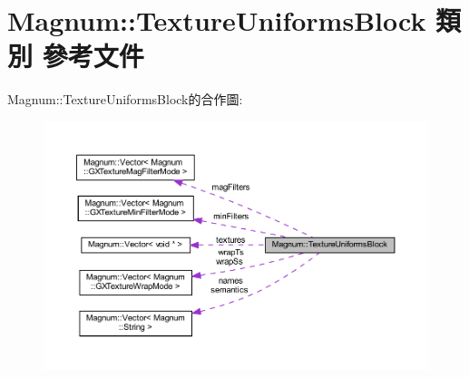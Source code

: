 \hypertarget{class_magnum_1_1_texture_uniforms_block}{}\section{Magnum\+:\+:Texture\+Uniforms\+Block 類別 參考文件}
\label{class_magnum_1_1_texture_uniforms_block}


Magnum\+:\+:Texture\+Uniforms\+Block的合作圖\+:\nopagebreak
\begin{figure}[H]
\begin{center}
\leavevmode
\includegraphics[width=350pt]{class_magnum_1_1_texture_uniforms_block__coll__graph}
\end{center}
\end{figure}
